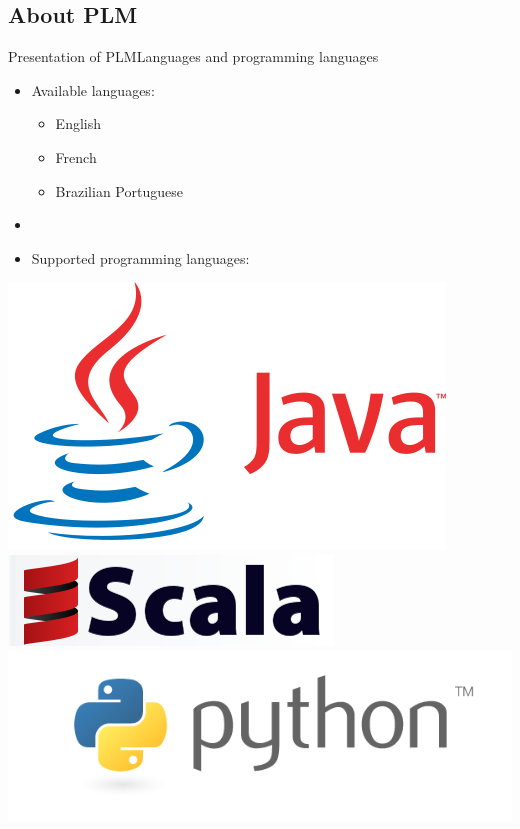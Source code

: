\documentclass{beamer}
\begin{document}
\subsection{About PLM}


\begin{frame}{Presentation of PLM}{Languages and programming languages}
  \begin{itemize}
    \item {
      Available languages:
      \begin{itemize}
      \item English
      \item French
      \item Brazilian Portuguese
      \end{itemize}
    }
    \item[~]
    \item {
      Supported programming languages:
    }
  \end{itemize}
  \begin{center}
    \includegraphics[scale=0.16]{img/java.png}
    ~
    \includegraphics[scale=0.4]{img/scala.png}
    \includegraphics[scale=0.18]{img/python.png}
  \end{center}
\end{frame}
\end{document}

